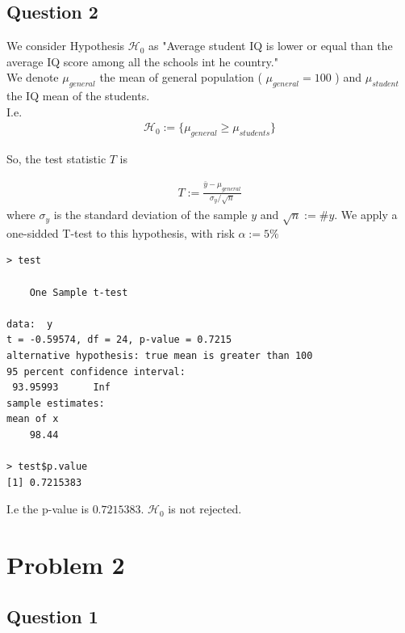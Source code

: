 \documentclass[12pt,letterpaper]{article}
\begin{document}
\vspace{.5cm}

\subsection*{Question 2}

We consider Hypothesis $ \mathcal{H}_0$ as  "Average student IQ is lower or equal than the average IQ score among all the schools int he country." \\
We denote $\mu_{general}$ the mean of general population ( $\mu_{general} = 100$ ) and $\mu_{student}$ the IQ mean of the students.\\
I.e. 
\begin{align*}
	 \mathcal{H}_0 := \{ \mu_{general} \geqslant \mu_{students} \}
\end{align*}

So, the test statistic $T$ is

\begin{align*}
	 T := \frac{\bar{y}-\mu_{general}}{\sigma_y / \sqrt{n}}
\end{align*}
where $\sigma_y$ is the standard deviation of the sample $y$ and $\sqrt{n}:= \# y $. 
\vspace{.25cm}
We apply a one-sidded T-test to this hypothesis, with risk $\alpha :=5\%$

  

\begin{verbatim}
> test

	One Sample t-test

data:  y
t = -0.59574, df = 24, p-value = 0.7215
alternative hypothesis: true mean is greater than 100
95 percent confidence interval:
 93.95993      Inf
sample estimates:
mean of x 
    98.44 

> test$p.value
[1] 0.7215383
\end{verbatim}


I.e the p-value is $0.7215383$.  $\mathcal{H}_0$ is not rejected.


\section*{Problem 2}

\subsection*{Question 1}
\end{document}
